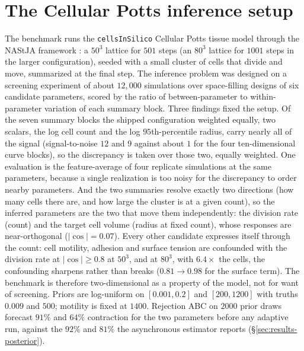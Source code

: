 \documentclass[10pt]{article}
\theoremstyle{plain}
\theoremstyle{definition}
\begin{document}
\section{The Cellular Potts inference setup}\label{app:cpm}
The benchmark runs the \texttt{cellsInSilico} Cellular Potts tissue model \citep{berghoff2020cis} through the NAStJA framework \citep{berghoff2018nastja}: a $50^3$ lattice for $501$ steps (an $80^3$ lattice for $1001$ steps in the larger configuration), seeded with a small cluster of cells that divide and move, summarized at the final step. The inference problem was designed on a screening experiment of about $12{,}000$ simulations over space-filling designs of six candidate parameters, scored by the ratio of between-parameter to within-parameter variation of each summary block. Three findings fixed the setup. Of the seven summary blocks the shipped configuration weighted equally, two scalars, the log cell count and the log $95$th-percentile radius, carry nearly all of the signal (signal-to-noise $12$ and $9$ against about $1$ for the four ten-dimensional curve blocks), so the discrepancy is taken over those two, equally weighted. One evaluation is the feature-average of four replicate simulations at the same parameters, because a single realization is too noisy for the discrepancy to order nearby parameters. And the two summaries resolve exactly two directions (how many cells there are, and how large the cluster is at a given count), so the inferred parameters are the two that move them independently: the division rate (count) and the target cell volume (radius at fixed count), whose responses are near-orthogonal ($|\cos|=0.07$). Every other candidate expresses itself through the count: cell motility, adhesion and surface tension are confounded with the division rate at $|\cos|\ge0.8$ at $50^3$, and at $80^3$, with $6.4\times$ the cells, the confounding sharpens rather than breaks ($0.81\to0.98$ for the surface term). The benchmark is therefore two-dimensional as a property of the model, not for want of screening. Priors are log-uniform on $[0.001,0.2]$ and $[200,1200]$ with truths $0.009$ and $500$; motility is fixed at $1400$. Rejection ABC on $2000$ prior draws forecast $91\%$ and $64\%$ contraction for the two parameters before any adaptive run, against the $92\%$ and $81\%$ the asynchronous estimator reports (\S\ref{sec:results-posterior}).
\end{document}
